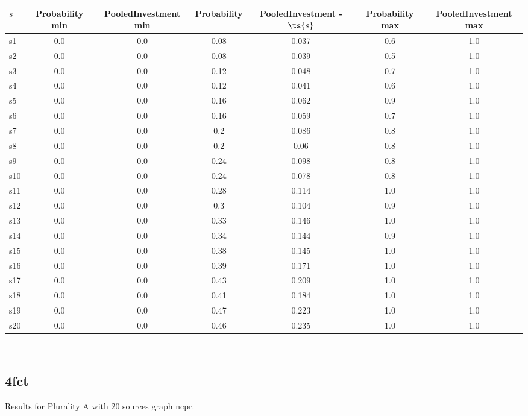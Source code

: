 \documentclass{article}
\begin{document}
\noindent\begin{tabular}{|l|c|c|c|c|c|c|}
\hline
$s$& Probability min & PooledInvestment min & Probability & PooledInvestment - $\ts{s}$ & Probability max & PooledInvestment max\\
\hline
s1 &0.0 & 0.0 & 0.08 & 0.037 & 0.6 & 1.0\\
\hline
s2 &0.0 & 0.0 & 0.08 & 0.039 & 0.5 & 1.0\\
\hline
s3 &0.0 & 0.0 & 0.12 & 0.048 & 0.7 & 1.0\\
\hline
s4 &0.0 & 0.0 & 0.12 & 0.041 & 0.6 & 1.0\\
\hline
s5 &0.0 & 0.0 & 0.16 & 0.062 & 0.9 & 1.0\\
\hline
s6 &0.0 & 0.0 & 0.16 & 0.059 & 0.7 & 1.0\\
\hline
s7 &0.0 & 0.0 & 0.2 & 0.086 & 0.8 & 1.0\\
\hline
s8 &0.0 & 0.0 & 0.2 & 0.06 & 0.8 & 1.0\\
\hline
s9 &0.0 & 0.0 & 0.24 & 0.098 & 0.8 & 1.0\\
\hline
s10 &0.0 & 0.0 & 0.24 & 0.078 & 0.8 & 1.0\\
\hline
s11 &0.0 & 0.0 & 0.28 & 0.114 & 1.0 & 1.0\\
\hline
s12 &0.0 & 0.0 & 0.3 & 0.104 & 0.9 & 1.0\\
\hline
s13 &0.0 & 0.0 & 0.33 & 0.146 & 1.0 & 1.0\\
\hline
s14 &0.0 & 0.0 & 0.34 & 0.144 & 0.9 & 1.0\\
\hline
s15 &0.0 & 0.0 & 0.38 & 0.145 & 1.0 & 1.0\\
\hline
s16 &0.0 & 0.0 & 0.39 & 0.171 & 1.0 & 1.0\\
\hline
s17 &0.0 & 0.0 & 0.43 & 0.209 & 1.0 & 1.0\\
\hline
s18 &0.0 & 0.0 & 0.41 & 0.184 & 1.0 & 1.0\\
\hline
s19 &0.0 & 0.0 & 0.47 & 0.223 & 1.0 & 1.0\\
\hline
s20 &0.0 & 0.0 & 0.46 & 0.235 & 1.0 & 1.0\\
\hline
\end{tabular}\\

\newpage

\subsection{4fct}

\noindent Results for Plurality A with 20 sources graph ncpr.
\end{document}
